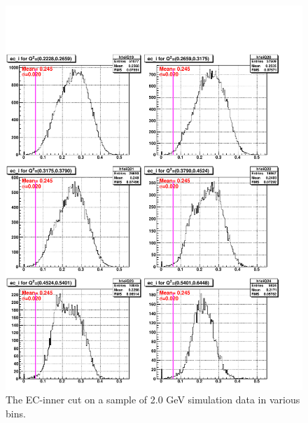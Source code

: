 \begin{figure}[H]%
\centering
\leavevmode \includegraphics[width=1.0\textwidth]{figuresEG4/FigCuts/ecCuts_eiOneD_Eb2_4ThsimN.pdf}  %
\caption[EC inner energy cut (Sim.)]{The EC-inner cut on a sample of 2.0 GeV simulation data in various \qsqs bins.}
\label{ecInSim6}
\end{figure}




